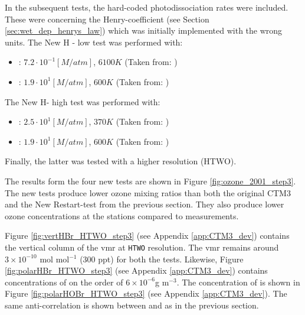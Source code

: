 In the subsequent tests, the hard-coded photodissociation rates were included. These were concerning the Henry-coefficient (see Section \ref{sec:wet_dep_henrys_law}) which was initially implemented with the wrong units. The New H - low test was performed with: 


\begin{itemize}
    \item {}: $7.2\cdot 10^{-1} [M/atm]$, $6100 K$ (Taken from: \cite{Chameides1992})
    \item {}: $1.9\cdot10^1 [M/atm]$, $600 K$ (Taken from: \cite{dean1999})
\end{itemize}

The New H- high test was performed with:  

\begin{itemize}
    \item {}: $2.5 \cdot 10^{1} [M/atm]$, $370 K$ (Taken from: \cite{dean1999})
    \item {}: $1.9\cdot10^1 [M/atm]$, $600 K$ (Taken from: \cite{dean1999})
\end{itemize}

Finally, the latter was tested with a higher resolution (HTWO). 

\medskip

The results form the four new tests are shown in Figure \ref{fig:ozone_2001_step3}. The new tests produce lower ozone mixing ratios than both the original CTM3 and the New Restart-test from the previous section. They also produce lower ozone concentrations at the stations compared to measurements. 





\medskip

Figure \ref{fig:vertHBr_HTWO_step3} (see Appendix \ref{app:CTM3_dev}) contains the vertical column of the  \acrshort{vmr} at \texttt{HTWO} resolution. The \acrshort{vmr} remains around $3\times10^{-10}$ mol mol$^{-1}$ (300 ppt) for both the tests. Likewise, Figure \ref{fig:polarHBr_HTWO_step3} (see Appendix \ref{app:CTM3_dev}) contains concentrations of  on the order of $6\times10^{-6} $g m$^{-3}$. The concentration of  is shown in Figure \ref{fig:polarHOBr_HTWO_step3} (see Appendix \ref{app:CTM3_dev}). The same anti-correlation is shown between  and  as in the previous section. 

